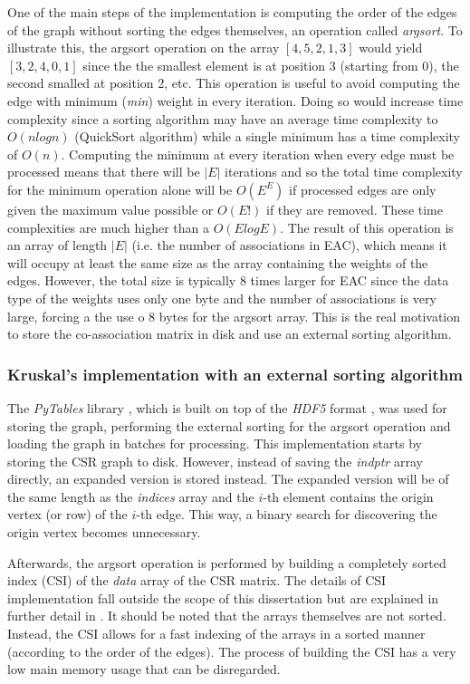 One of the main steps of the implementation is computing the order of the edges of the graph without sorting the edges themselves, an operation called \emph{argsort}.
To illustrate this, the argsort operation on the array $ \left [  4 , 5 , 2 , 1, 3 \right ]$ would yield $ \left [  3 , 2 , 4, 0 , 1 \right ]$ since the the smallest element is at position 3 (starting from 0), the second smalled at position 2, etc.
This operation is useful to avoid computing the edge with minimum (\emph{min}) weight in every iteration.
Doing so would increase time complexity since a sorting algorithm may have an average time complexity to $O(n log n)$ (QuickSort algorithm) while a single minimum has a time complexity of $O(n)$.
Computing the minimum at every iteration when every edge must be processed means that there will be $|E|$ iterations and so the total time complexity for the minimum operation alone will be $O(E ^ E)$ if processed edges are only given the maximum value possible or $O(E!)$ if they are removed.
These time complexities are much higher than a $O(E log E)$.
The result of this operation is an array of length $|E|$ (i.e. the number of associations in EAC), which means it will occupy at least the same size as the array containing the weights of the edges.
However, the total size is typically 8 times larger for EAC since the data type of the weights uses only one byte and the number of associations is very large, forcing a the use o 8 bytes for the argsort array.
This is the real motivation to store the co-association matrix in disk and use an external sorting algorithm.

\subsubsection{Kruskal's implementation with an external sorting algorithm}

The \emph{PyTables} library \cite{pytables}, which is built on top of the \emph{HDF5} format \cite{hdf5}, was used for storing the graph, performing the external sorting for the argsort operation and loading the graph in batches for processing.
This implementation starts by storing the CSR graph to disk.
However, instead of saving the \emph{indptr} array directly, an expanded version is stored instead.
The expanded version will be of the same length as the \emph{indices} array and the $i$-th element contains the origin vertex (or row) of the $i$-th edge.
This way, a binary search for discovering the origin vertex becomes unnecessary.

Afterwards, the argsort operation is performed by building a completely sorted index (CSI) of the \emph{data} array of the CSR matrix.
The details of CSI implementation fall outside the scope of this dissertation but are explained in further detail in \cite{AltetiAbad2007}.
It should be noted that the arrays themselves are not sorted.
Instead, the CSI allows for a fast indexing of the arrays in a sorted manner (according to the order of the edges).
The process of building the CSI has a very low main memory usage that can be disregarded.

